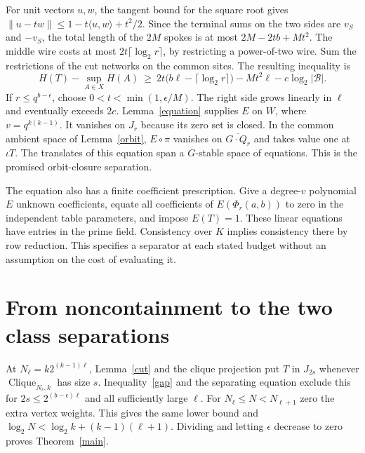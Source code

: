 \documentclass[11pt,letterpaper]{article}
\newcommand{\Cl}{\operatorname{Clique}}
\newcommand{\bal}{\mathcal B}
\begin{document}
For unit vectors $u,w$, the tangent bound for the square root gives
$\|u-tw\|\le1-t\langle u,w\rangle+t^2/2$.
Since the terminal sums on the two sides are $v_S$ and $-v_S$, the
total length of the $2M$ spokes is at most $2M-2tb+Mt^2$.
The middle wire costs at most $2t\lceil\log_2 r\rceil$, by restricting
a power-of-two wire. Sum the restrictions of the cut networks on the
common sites. The resulting inequality is
\[
 H(T)-\sup_{A\in X}H(A)
 \ \ge\ 2t\bigl(b\ell-\lceil\log_2 r\rceil\bigr)
                -Mt^2\ell-c\log_2|\bal| .
 \tag{2}\label{gap}
\]
If $r\le q^{b-\epsilon}$, choose $0<t<\min(1,\epsilon/M)$.
The right side grows linearly in $\ell$ and eventually exceeds $2c$.
Lemma~\ref{equation} supplies $E$ on $W$, where $v=q^{k(k-1)}$.
It vanishes on $J_r$ because its zero set is closed. In the common
ambient space of Lemma~\ref{orbit}, $E\circ\pi$ vanishes on
$\overline{G\cdot Q_r}$ and takes value one at $\iota T$.
The translates of this equation span a $G$-stable space of equations.
This is the promised orbit-closure separation.

The equation also has a finite coefficient prescription. Give a
degree-$v$ polynomial $E$ unknown coefficients, equate all coefficients
of $E(\Phi_r(a,b))$ to zero in the independent table parameters, and
impose $E(T)=1$. These linear equations have entries in the prime
field. Consistency over $K$ implies consistency there by row reduction.
This specifies a separator at each stated budget without an assumption
on the cost of evaluating it.

\section{From noncontainment to the two class separations}
At $N_\ell=k2^{(k-1)\ell}$, Lemma~\ref{cut} and the clique projection
put $T$ in $J_{2s}$ whenever $\Cl_{N_\ell,k}$ has size $s$.
Inequality~\eqref{gap} and the separating equation exclude this for
$2s\le 2^{(b-\epsilon)\ell}$ and all sufficiently large $\ell$.
For $N_\ell\le N<N_{\ell+1}$ zero the extra vertex weights. This gives
the same lower bound and $\log_2 N<\log_2 k+(k-1)(\ell+1)$.
Dividing and letting $\epsilon$ decrease to zero proves Theorem~\ref{main}.
\end{document}
